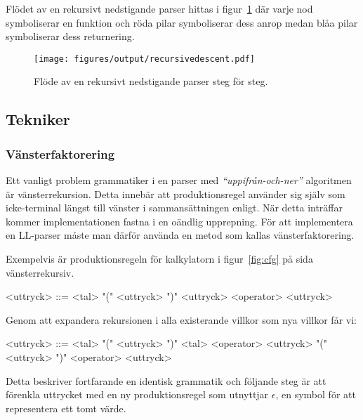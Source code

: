 Flödet av en rekursivt nedstigande parser hittas i
figur~\ref{fig:recursivedescent} där varje nod symboliserar en funktion och
röda pilar symboliserar dess anrop medan blåa pilar symboliserar dess returnering.

\begin{figure}[ht]
  \texttt{[image: figures/output/recursivedescent.pdf]}
  \caption{Flöde av en rekursivt nedstigande parser steg för steg.}
  \label{fig:recursivedescent}
\end{figure}

\subsection{Tekniker}



\subsubsection{Vänsterfaktorering}

Ett vanligt problem grammatiker i en parser med \textit{``uppifrån-och-ner''}
algoritmen är vänsterrekursion. Detta innebär att produktionsregel använder
sig själv som icke-terminal längst till vänster i sammansättningen enligt. När
detta inträffar kommer implementationen fastna i en oändlig upprepning. För
att implementera en LL-parser måste man därför använda en metod som kallas
vänsterfaktorering.

Exempelvis är produktionsregeln för kalkylatorn i figur~\ref{fig:cfg} på sida
\pageref{fig:cfg} vänsterrekursiv.

\setlength{\grammarindent}{5em}
\begin{grammar}
  \singlespace\small%
  \selectfont
  <uttryck> ::= <tal>
    \alt "(" <uttryck> ")"
    \alt <uttryck> <operator> <uttryck>
\end{grammar}

Genom att expandera rekursionen i alla existerande villkor som nya villkor får
vi:

\setlength{\grammarindent}{5em}
\begin{grammar}
  \singlespace\small%
  \selectfont
  <uttryck> ::= <tal>
    \alt "(" <uttryck> ")"
    \alt <tal> <operator> <uttryck>
    \alt "(" <uttryck> ")" <operator> <uttryck>
\end{grammar}

Detta beskriver fortfarande en identisk grammatik och följande steg är att
förenkla uttrycket med en ny produktionsregel som utnyttjar $\epsilon$, en
symbol för att representera ett tomt värde.


